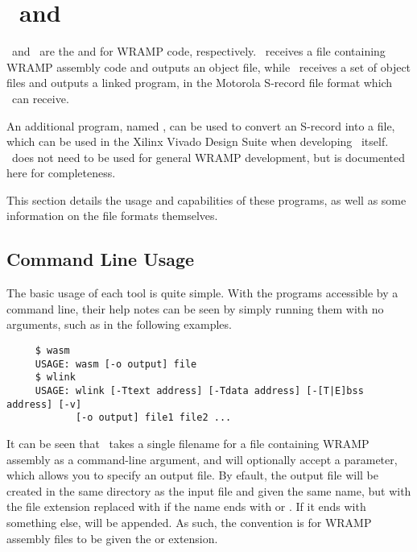 \setcounter{secnumdepth}{0}

\section{\wasm\ and \wlink}

\wasm\ and \wlink\ are the  and  for WRAMP code,
respectively. \wasm\ receives a file containing WRAMP assembly code and
outputs an object file, while \wlink\ receives a set of object files
and outputs a linked program, in the Motorola S-record file format which
\WRAMPmon\ can receive.

An additional program, named \trim, can be used to convert an S-record
into a  file, which can be used in the Xilinx Vivado Design
Suite when developing \WRAMPmon\ itself. \trim\ does not need to be
used for general WRAMP development, but is documented here for completeness.

This section details the usage and capabilities of these programs, as well as
some information on the file formats themselves.

\subsection{Command Line Usage}

The basic usage of each tool is quite simple. With the programs accessible by
a command line, their help notes can be seen by simply running them with no
arguments, such as in the following examples.

\begin{verbatim}
     $ wasm
     USAGE: wasm [-o output] file
     $ wlink
     USAGE: wlink [-Ttext address] [-Tdata address] [-[T|E]bss address] [-v] 
            [-o output] file1 file2 ...
\end{verbatim}

It can be seen that \wasm\ takes a single filename for a file containing
WRAMP assembly as a command-line argument, and will optionally accept a
 parameter, which allows you to specify an output file. By 
efault, the output file will be created in the same directory as the input
file and given the same name, but with the file extension replaced with
 if the name ends with  or . If it
ends with something else,  will be appended. As such, the
convention is for WRAMP assembly files to be given the  or
 extension.

